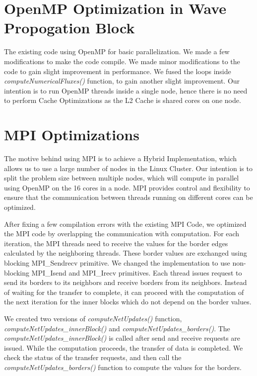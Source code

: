 \documentclass[]{article}
\begin{document}
\section{OpenMP Optimization in Wave Propogation Block}
The existing code using OpenMP for basic parallelization. We made a few modifications to make the code compile.
We made minor modifications to the code to gain slight improvement in performance. We fused the loops inside
\textit{computeNumericalFluxes()} function, to gain another slight improvement. Our intention is to run OpenMP
threads inside a single node, hence there is no need to perform Cache Optimizations as the L2 Cache is shared
cores on one node.

\section{MPI Optimizations}
The motive behind using MPI is to achieve a Hybrid Implementation, which allows us to use a large number of nodes
in the Linux Cluster. Our intention is to split the problem size between multiple nodes, which will compute in
parallel using OpenMP on the 16 cores in a node. MPI provides control and flexibility to ensure that the
communication between threads running on different cores can be optimized.

After fixing a few compilation errors with the existing MPI Code, we optimized the MPI code by overlapping the
communication with computation. For each iteration, the MPI threads need to receive the values for the border edges calculated by the neighboring threads. These border values are exchanged using blocking MPI\_Sendrecv primitive. We
changed the implementation to use non-blocking MPI\_Isend and MPI\_Irecv primitives. Each thread issues request to
send its borders to its neighbors and receive borders from its neighbors. Instead of waiting for the transfer to complete, it can proceed with the computation of the next iteration for the inner blocks which do not depend on the
border values. 

We created two versions of \textit{computeNetUpdates()} function, \textit{computeNetUpdates\_innerBlock()} and \textit{computeNetUpdates\_borders()}. The \textit{computeNetUpdates\_innerBlock()} is called after
send and receive requests are issued. While the computation proceeds, the transfer of data is completed. We
check the status of the transfer requests, and then call the \textit{computeNetUpdates\_borders()} function to
compute the values for the borders.
\end{document}
